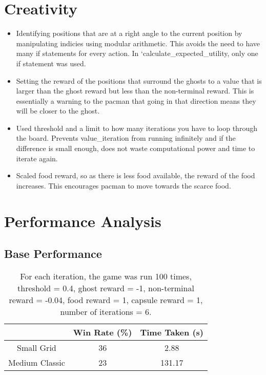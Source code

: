 \documentclass[12pt]{report}
\begin{document}
      \section*{Creativity}
        \begin{itemize}
          \item Identifying positions that are at a right angle to the current position by manipulating indicies using modular arithmetic. This avoids the need to have many if statements for every action. In `calculate\_expected\_utility, only one if statement was used.
          \item Setting the reward of the positions that surround the ghosts to a value that is larger than the ghost reward but less than the non-terminal reward. This is essentially a warning to the pacman that going in that direction means they will be closer to the ghost.
          \item Used threshold and a limit to how many iterations you have to loop through the board. Prevents value\_iteration from running infinitely and if the difference is small enough, does not waste computational power and time to iterate again.
          \item Scaled food reward, so as there is less food available, the reward of the food increases. This encourages pacman to move towards the scarce food.
        \end{itemize}

      \section*{Performance Analysis}
      \subsection*{Base Performance}
        \begin{table}[H]
          \begin{center}
            \begin{adjustbox}{max width=\textwidth}
            \begin{tabular}{*{3}{c}}

              \textbf{} & \textbf{Win Rate (\%)} & \textbf{Time Taken (s)}\\
              \hline
                    Small Grid & 36 & 2.88 \\
                    Medium Classic & 23 & 131.17 \\

            \end{tabular}
            \end{adjustbox}
            \caption{For each iteration, the game was run 100 times, threshold = 0.4, ghost reward = -1, non-terminal reward = -0.04, food reward = 1, capsule reward = 1, number of iterations = 6.}
            \label{tab:table4}
          \end{center}
        \end{table}
        \vspace{-5mm}
\end{document}
